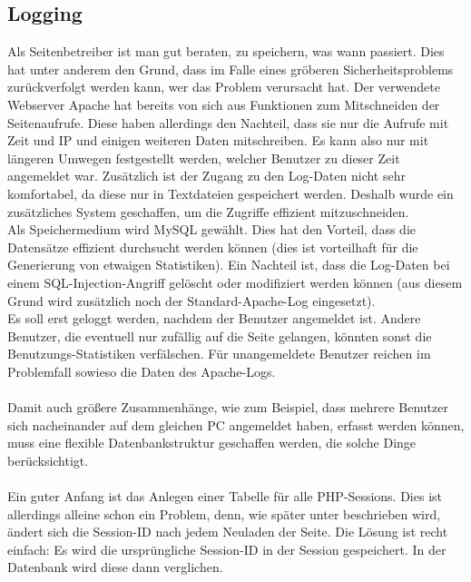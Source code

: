 \subsection{Logging}

Als Seitenbetreiber ist man gut beraten, zu speichern, was wann passiert. Dies hat unter anderem den Grund, dass im Falle eines gröberen Sicherheitsproblems zurückverfolgt werden kann, wer das Problem verursacht hat. Der verwendete Webserver Apache hat bereits von sich aus Funktionen zum Mitschneiden der Seitenaufrufe. Diese haben allerdings den Nachteil, dass sie nur die Aufrufe mit Zeit und IP und einigen weiteren Daten mitschreiben. Es kann also nur mit längeren Umwegen festgestellt werden, welcher Benutzer zu dieser Zeit angemeldet war. Zusätzlich ist der Zugang zu den Log-Daten nicht sehr komfortabel, da diese nur in Textdateien gespeichert werden. Deshalb wurde ein zusätzliches System geschaffen, um die Zugriffe effizient mitzuschneiden.\\
Als Speichermedium wird MySQL gewählt. Dies hat den Vorteil, dass die Datensätze effizient durchsucht werden können (dies ist vorteilhaft für die Generierung von etwaigen Statistiken). Ein Nachteil ist, dass die Log-Daten bei einem SQL-Injection-Angriff gelöscht oder modifiziert werden können (aus diesem Grund wird zusätzlich noch der Standard-Apache-Log eingesetzt).\\
Es soll erst geloggt werden, nachdem der Benutzer angemeldet ist. Andere Benutzer, die eventuell nur zufällig auf die Seite gelangen, könnten sonst die Benutzungs-Statistiken verfälschen. Für unangemeldete Benutzer reichen im Problemfall sowieso die Daten des Apache-Logs.\\
\\
Damit auch größere Zusammenhänge, wie zum Beispiel, dass mehrere Benutzer sich nacheinander auf dem gleichen PC angemeldet haben, erfasst werden können, muss eine flexible Datenbankstruktur geschaffen werden, die solche Dinge berücksichtigt.\\
\\
Ein guter Anfang ist das Anlegen einer Tabelle für alle PHP-Sessions. Dies ist allerdings alleine schon ein Problem, denn, wie später unter  beschrieben wird, ändert sich die Session-ID nach jedem Neuladen der Seite. Die Lösung ist recht einfach: Es wird die ursprüngliche Session-ID in der Session gespeichert. In der Datenbank wird diese dann verglichen.\\

